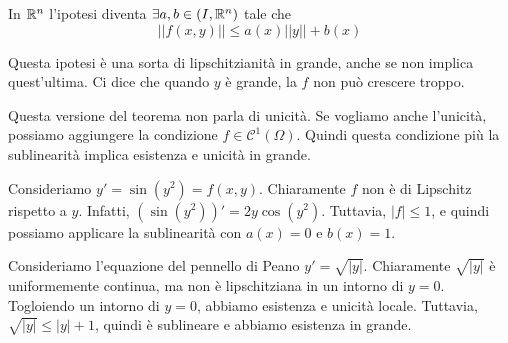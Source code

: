 \documentclass[a4paper]{article}
\begin{document}
In \(\mathbb{R}^n\) l'ipotesi diventa
\(\exists a,b \in \mathcal(I, \mathbb{R}^n)\)
tale che
\[
    ||f(x,y)|| \leq a(x)||y|| + b(x)
\]

Questa ipotesi è una sorta di lipschitzianità in grande, anche se non implica quest'ultima.
Ci dice che quando \(y\) è grande, la \(f\) non può crescere troppo.

Questa versione del teorema non parla di unicità.
Se vogliamo anche l'unicità, possiamo aggiungere la condizione
\(f \in \mathcal C^1(\Omega)\).
Quindi questa condizione più la sublinearità implica esistenza e unicità in grande.

\begin{snippetexample}{}
    Consideriamo \(y' = \sin(y^2) = f(x,y)\).
    Chiaramente \(f\) non è di Lipschitz rispetto a \(y\).
    Infatti, \((\sin(y^2))' = 2y\cos(y^2)\).
    Tuttavia, \(|f| \leq 1\), e quindi possiamo applicare la sublinearità
    con \(a(x) = 0\) e \(b(x) = 1\).
\end{snippetexample}

\begin{snippetexample}{}
    Consideriamo l'equazione del pennello di Peano
    \(y' = \sqrt{|y|}\).
    Chiaramente \(\sqrt{|y|}\) è uniformemente continua, ma non è lipschitziana
    in un intorno di \(y=0\).
    Togloiendo un intorno di \(y=0\), abbiamo esistenza e unicità locale.
    Tuttavia, \(\sqrt{|y|} \leq |y| + 1\), quindi è sublineare e abbiamo esistenza in grande.
\end{snippetexample}
\end{document}
